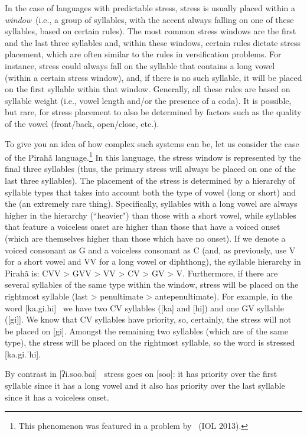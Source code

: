 \begin{refsection}
In the case of languages with predictable stress, stress is usually placed within a \textit{window}\ (i.e., a group of syllables, with the accent always falling on one of these syllables, based on certain rules). The most common stress windows are the first and the last three syllables and, within these windows, certain rules dictate stress placement, which are often similar to the rules in versification problems. For instance, stress could always fall on the syllable that contains a long vowel (within a certain stress window), and, if there is no such syllable, it will be placed on the first syllable within that window. Generally, all these rules are based on syllable weight (i.e., vowel length and/or the presence of a coda). It is possible, but rare, for stress placement to also be determined by factors such as the quality of the vowel (front/back, open/close, etc.).

To give you an idea of how complex such systems can be, let us consider the case of the Pirahã language.\footnote{This phenomenon was featured in a problem by \nameASemenuks\ (IOL 2013).} In this language, the stress window is represented by the final three syllables (thus, the primary stress will always be placed on one of the last three syllables). The placement of the stress is determined by a hierarchy of syllable types that takes into account both the type of vowel (long or short) and the  (an extremely rare thing). Specifically, syllables with a long vowel are always higher in the hierarchy (``heavier") than those with a short vowel, while syllables that feature a voiceless onset are higher than those that have a voiced onset (which are themselves higher than those which have no onset). If we denote a voiced consonant as G and a voiceless consonant as C (and, as previously, use V for a short vowel and VV for a long vowel or diphthong), the syllable hierarchy in Pirahã is: CVV > GVV > VV > CV > GV > V. Furthermore, if there are several syllables of the same type within the window, stress will be placed on the rightmost syllable (last > penultimate > antepenultimate). For example, in the word [{ka.gi.hi}] \ we have two CV syllables ([ka] and [hi]) and one GV syllable ([gi]]. We know that CV syllables have priority, so, certainly, the stress will not be placed on [gi]. Amongst the remaining two syllables (which are of the same type), the stress will be placed on the rightmost syllable, so the word is stressed [ka.gi.ˈhi].

By contrast in [ʔi.soo.bai] \ stress goes on [soo]: it has priority over the first syllable since it has a long vowel and it also has priority over the last syllable since it has a voiceless onset.


\end{refsection}
